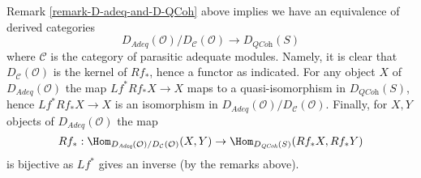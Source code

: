 \begin{remark}
\label{remark-conclusion}
Remark \ref{remark-D-adeq-and-D-QCoh}
above implies we have an equivalence of derived categories
$$
D_{\textit{Adeq}}(\mathcal{O})/D_\mathcal{C}(\mathcal{O})
\longrightarrow
D_{\textit{QCoh}}(S)
$$
where $\mathcal{C}$ is the category of parasitic adequate modules.
Namely, it is clear that $D_\mathcal{C}(\mathcal{O})$ is the kernel
of $Rf_*$, hence a functor as indicated. For any object $X$ of
$D_{\textit{Adeq}}(\mathcal{O})$ the map $Lf^*Rf_*X \to X$ maps
to a quasi-isomorphism in $D_{\textit{QCoh}}(S)$, hence
$Lf^*Rf_*X \to X$ is an isomorphism in
$D_{\textit{Adeq}}(\mathcal{O})/D_\mathcal{C}(\mathcal{O})$.
Finally, for $X, Y$ objects of $D_{\textit{Adeq}}(\mathcal{O})$
the map
$$
Rf_* :
\Hom_{D_{\textit{Adeq}}(\mathcal{O})/D_\mathcal{C}(\mathcal{O})}(X, Y)
\to
\Hom_{D_{\textit{QCoh}}(S)}(Rf_*X, Rf_*Y)
$$
is bijective as $Lf^*$ gives an inverse (by the remarks above).
\end{remark}















